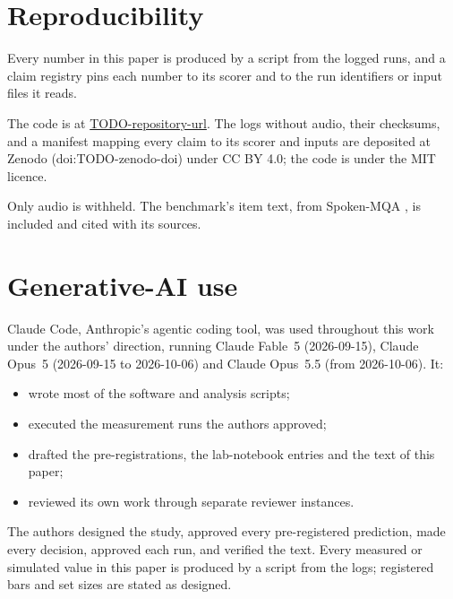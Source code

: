 \documentclass[a4paper,10pt,twocolumn]{article}
\newif\ifanonymous
\newcommand{\releasedoi}{TODO-zenodo-doi}     %
\newcommand{\repourl}{\url{TODO-repository-url}}  %
\newcommand{\anonmirror}{\url{TODO-anonymous-mirror-url}}  %
\newcommand{\theauthor}{the authors}
\newcommand{\theauthors}{the authors'}
\newcommand{\Theauthor}{The authors}
\newcommand{\theauthor}{the author}
\newcommand{\theauthors}{the author's}
\newcommand{\Theauthor}{The author}
\begin{document}



\section*{Reproducibility}
\label{sec:repro}
Every number in this paper is produced by a script from the logged runs, and a
claim registry pins each number to its scorer and to the run identifiers or
input files it reads.
\ifanonymous
An anonymized mirror of the code and the generated results is at
\anonmirror. The logs without audio, and a manifest mapping every claim to
its scorer and inputs, will be deposited on publication.
\else
The code is at \repourl. The logs without audio, their checksums, and a
manifest mapping every claim to its scorer and inputs are deposited at Zenodo
(doi:\releasedoi) under CC BY 4.0; the code is under the MIT licence.
\fi
Only audio is withheld. The benchmark's item text, from Spoken-MQA
\cite{wei2025towards}, is included and cited with its sources.

\section*{Generative-AI use}
\label{sec:genai}

Claude Code, Anthropic's agentic coding tool, was used throughout this work
under \theauthors{} direction, running Claude Fable~5 (2026-09-15), Claude
Opus~5 (2026-09-15 to 2026-10-06) and Claude Opus~5.5 (from 2026-10-06). It:
\begin{itemize}
\item wrote most of the software and analysis scripts;
\item executed the measurement runs \theauthor{} approved;
\item drafted the pre-registrations, the lab-notebook entries and the text of
  this paper;
\item reviewed its own work through separate reviewer instances.
\end{itemize}
\Theauthor{} designed the study, approved every pre-registered prediction,
made every decision, approved each run, and verified the text. Every measured or
simulated value in this paper is produced by a script from the logs;
registered bars and set sizes are stated as designed.
\end{document}
